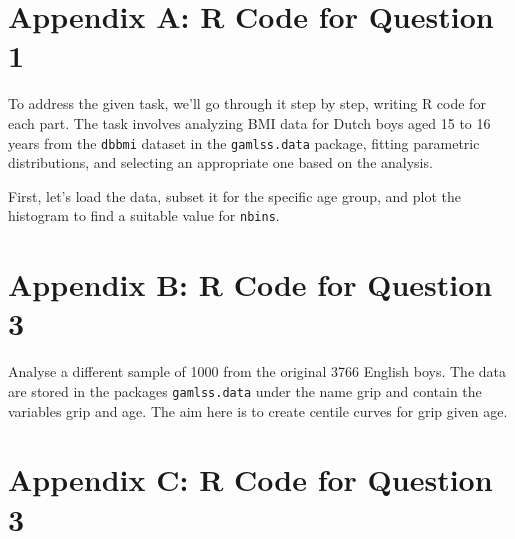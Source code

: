 \documentclass{article}
\begin{document}
\singlespacing 
\tableofcontents
\listoffigures
\listoftables
\doublespacing

\newpage



\pagebreak



\pagebreak



\pagebreak



%

\pagebreak



\pagebreak

\printbibliography

\pagebreak

\appendix
\singlespacing

\section{Appendix A: R Code for Question 1}

To address the given task, we’ll go through it step by step, writing R code for each part. The task involves analyzing
BMI data for Dutch boys aged 15 to 16 years from the \texttt{dbbmi} dataset in the \texttt{gamlss.data} package, fitting
parametric distributions, and selecting an appropriate one based on the analysis.

First, let's load the data, subset it for the specific age group, and
plot the histogram to find a suitable value for \texttt{nbins}.

                   

\section{Appendix B: R Code for Question 3}

Analyse a different sample of 1000 from the original 3766
English boys. The data are stored in the packages \texttt{gamlss.data} under the
name grip and contain the variables grip and age. The aim here is to
create centile curves for grip given age.

                   

\section{Appendix C: R Code for Question 3}

%                   
\end{document}
